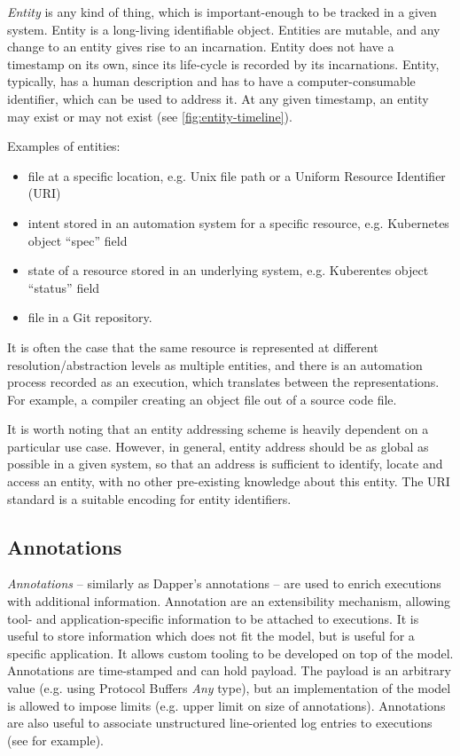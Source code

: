 \textit{Entity} is any kind of thing, which is important-enough to be tracked in a given system. Entity is a long-living identifiable object. Entities are mutable, and any change to an entity gives rise to an incarnation. Entity does not have a timestamp on its own, since its life-cycle is recorded by its incarnations. Entity, typically, has a human description and has to have a computer-consumable identifier, which can be used to address it. At any given timestamp, an entity may exist or may not exist (see \cref{fig:entity-timeline}).

Examples of entities:
%
\begin{itemize}
	\item file at a specific location, e.g. Unix file path or a Uniform Resource Identifier (URI)
	\item intent stored in an automation system for a specific resource, e.g. Kubernetes object ``spec''  field
	\item state of a resource stored in an underlying system, e.g. Kuberentes object ``status''  field
	\item file in a Git repository.
\end{itemize}

It is often the case that the same resource is represented at different resolution/abstraction levels as multiple entities, and there is an automation process recorded as an execution, which translates between the representations. For example, a compiler creating an object file out of a source code file.

It is worth noting that an entity addressing scheme is heavily dependent on a particular use case. However, in general, entity address should be as global as possible in a given system, so that an address is sufficient to identify, locate and access an entity, with no other pre-existing knowledge about this entity. The URI standard is a suitable encoding for entity identifiers.

\subsection{Annotations}\label{sec:model-annotation}

\textit{Annotations} -- similarly as Dapper’s annotations -- are used to enrich executions with additional information. Annotation are an extensibility mechanism, allowing tool- and application-specific information to be attached to executions.  It is useful to store information which does not fit the model, but is useful for a specific application. It allows custom tooling to be developed on top of the model.  Annotations are time-stamped and can hold payload. The payload is an arbitrary value (e.g. using Protocol Buffers \textit{Any} type), but an implementation of the model is allowed to impose limits (e.g. upper limit on size of annotations). Annotations are also useful to associate unstructured line-oriented log entries to executions (see  for example).

